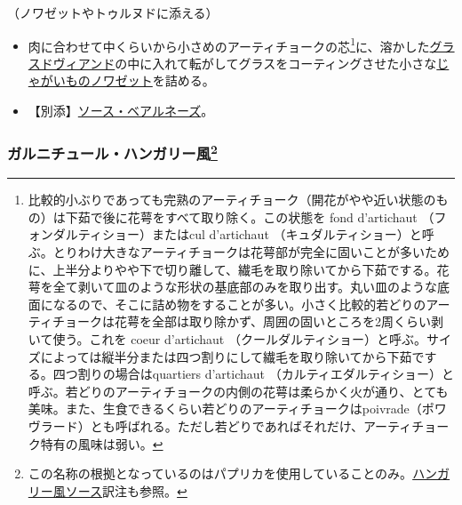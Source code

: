 \begin{recette}


（ノワゼットやトゥルヌドに添える）

\begin{itemize}
\item
  肉に合わせて中くらいから小さめのアーティチョークの芯\footnote{比較的小ぶりであっても完熟のアーティチョーク（開花がやや近い状態のもの）は下茹で後に花萼をすべて取り除く。この状態を
    fond d'artichaut （フォンダルティショー）またはcul d'artichaut
    （キュダルティショー）と呼ぶ。とりわけ大きなアーティチョークは花萼部が完全に固いことが多いために、上半分よりやや下で切り離して、繊毛を取り除いてから下茹でする。花萼を全て剥いて皿のような形状の基底部のみを取り出す。丸い皿のような底面になるので、そこに詰め物をすることが多い。小さく比較的若どりのアーティチョークは花萼を全部は取り除かず、周囲の固いところを2周くらい剥いて使う。これを
    coeur d'artichaut
    （クールダルティショー）と呼ぶ。サイズによっては縦半分または四つ割りにして繊毛を取り除いてから下茹でする。四つ割りの場合はquartiers
    d'artichaut
    （カルティエダルティショー）と呼ぶ。若どりのアーティチョークの内側の花萼は柔らかく火が通り、とても美味。また、生食できるくらい若どりのアーティチョークはpoivrade（ポワヴラード）とも呼ばれる。ただし若どりであればそれだけ、アーティチョーク特有の風味は弱い。}に、溶かした\protect\hyperlink{glace-de-viande}{グラスドヴィアンド}の中に入れて転がしてグラスをコーティングさせた小さな\protect\hyperlink{pommes-de-terre-noisette}{じゃがいものノワゼット}を詰める。
\item
  【別添】\protect\hyperlink{sauce-bearnaise}{ソース・ベアルネーズ}。
\end{itemize}

\atoaki{}

\hypertarget{garniture-hongroise}{%
\subsubsection[ガルニチュール・ハンガリー風]{\texorpdfstring{ガルニチュール・ハンガリー風\footnote{この名称の根拠となっているのはパプリカを使用していることのみ。\protect\hyperlink{sauce-hongroise}{ハンガリー風ソース}訳注も参照。}}{ガルニチュール・ハンガリー風}}\label{garniture-hongroise}}


\end{recette}
